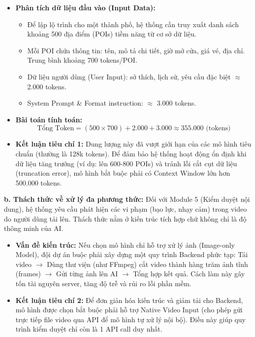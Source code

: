 \begin{itemize}
    \item \textbf{Phân tích dữ liệu đầu vào (Input Data):}
    \begin{itemize}
        \item Để lập lộ trình cho một thành phố, hệ thống cần truy xuất danh sách khoảng 500 địa điểm (POIs) tiềm năng từ cơ sở dữ liệu.
        \item Mỗi POI chứa thông tin: tên, mô tả chi tiết, giờ mở cửa, giá vé, địa chỉ. Trung bình khoảng 700 tokens/POI.
        \item Dữ liệu người dùng (User Input): sở thích, lịch sử, yêu cầu đặc biệt $\approx$ 2.000 tokens.
        \item System Prompt \& Format instruction: $\approx$ 3.000 tokens.
    \end{itemize}

    \item \textbf{Bài toán tính toán:}
    \begin{equation}
    \text{Tổng Token} = (500 \times 700) + 2.000 + 3.000 \approx 355.000 \text{ (tokens)}
    \end{equation}

    \item \textbf{Kết luận tiêu chí 1:} Dung lượng này đã vượt giới hạn của các mô hình tiêu chuẩn (thường là 128k tokens). Để đảm bảo hệ thống hoạt động ổn định khi dữ liệu tăng trưởng (ví dụ: lên 600-800 POIs) và tránh lỗi cắt cụt dữ liệu (truncation error), mô hình bắt buộc phải có Context Window lớn hơn 500.000 tokens.
\end{itemize}

\textbf{b. Thách thức về xử lý đa phương thức:} Đối với Module 5 (Kiểm duyệt nội dung), hệ thống yêu cầu phát hiện các vi phạm (bạo lực, nhạy cảm) trong video do người dùng tải lên. Thách thức nằm ở kiến trúc tích hợp chứ không chỉ là độ thông minh của AI.
\begin{itemize}
    \item \textbf{Vấn đề kiến trúc:} Nếu chọn mô hình chỉ hỗ trợ xử lý ảnh (Image-only Model), đội dự án buộc phải xây dựng một quy trình Backend phức tạp: Tải video $\rightarrow$ Dùng thư viện (như FFmpeg) cắt video thành hàng trăm ảnh tĩnh (frames) $\rightarrow$ Gửi từng ảnh lên AI $\rightarrow$ Tổng hợp kết quả. Cách làm này gây tốn tài nguyên server, tăng độ trễ và rủi ro lỗi phần mềm.
    \item \textbf{Kết luận tiêu chí 2:} Để đơn giản hóa kiến trúc và giảm tải cho Backend, mô hình được chọn bắt buộc phải hỗ trợ Native Video Input (cho phép gửi trực tiếp file video qua API để mô hình tự xử lý nội bộ). Điều này giúp quy trình kiểm duyệt chỉ còn là 1 API call duy nhất.
\end{itemize}

